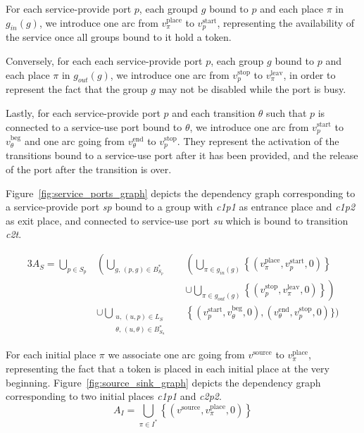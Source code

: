 For each service-provide port $p$, each groupd $g$ bound to $p$ and
each place $\pi$ in $g_{in}(g)$, we introduce one arc from
$v_\pi^\text{place}$ to $v_p^\text{start}$, representing the
availability of the service once all groups bound to it hold a token.

Conversely, for each each service-provide port $p$, each group $g$
bound to $p$ and each place $\pi$ in $g_{out}(g)$, we introduce one
arc from $v_p^\text{stop}$ to $v_\pi^\text{leav}$, in order to
represent the fact that the group $g$ may not be disabled while the
port is busy.

Lastly, for each service-provide port $p$ and each transition $\theta$
such that $p$ is connected to a service-use port bound to $\theta$, we
introduce one arc from $v_p^\text{start}$ to $v_\theta^\text{beg}$ and
one arc going from $v_\theta^\text{end}$ to $v_p^\text{stop}$. They
represent the activation of the transitions bound to a service-use
port after it has been provided, and the release of the port after the
transition is over.

Figure~\ref{fig:service_ports_graph} depicts the dependency graph corresponding to a
service-provide port \emph{sp} bound to a group with \emph{c1p1} as entrance
place and \emph{c1p2} as exit place, and connected to service-use port
\emph{su} which is bound to transition \emph{c2t}.

\begin{alignat*}{3}
A_{S}=\bigcup_{p\in S_p}
& \left(\bigcup_{g,\,\left(p,g\right)\in B_{S_{p}}^*} \right. && \left. \left(\bigcup_{\pi\in g_{in}(g)} \left\{\left(v_\pi^\text{place},v_p^\text{start},0\right)\right\}\right.\right. \\
&&& \left. \cup\left.\bigcup_{\pi\in g_{out}(g)} \left\{\left(v_p^\text{stop},v_\pi^\text{leav},0\right)\right\}\right)\right. \\
& \left.\cup\bigcup_{\substack{u,\,\left(u,p\right)\in L_S \\
      \theta,\,\left(u,\theta\right)\in B_{S_{u}}^*}} \right. && \left. \left\{ \left(v_p^\text{start},v_\theta^\text{beg},0\right),\right.\right. \left.\left.\left(v_\theta^\text{end},v_p^\text{stop},0\right)\right.\Big\}\right.\Bigg)
\end{alignat*}



For each initial place $\pi$ we associate one arc going from $v^\text{source}$
 to $v_\pi^\text{place}$, representing the fact that a token is placed in each
 initial place at the very beginning.
Figure~\ref{fig:source_sink_graph} depicts the dependency graph corresponding to two initial
places \emph{c1p1} and \emph{c2p2}.
\[
A_{I}=\bigcup_{\pi\in I^*}\left\{ \left(v^\text{source},v_\pi^\text{place},0\right)\right\} 
\]

